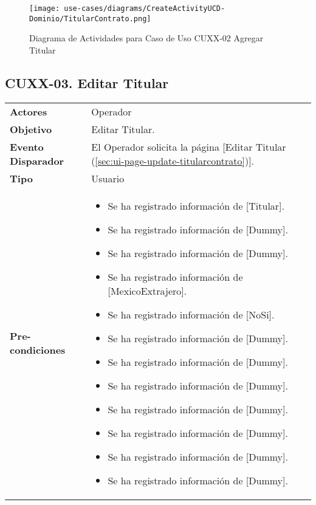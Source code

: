 	\begin{figure}[H]
		\begin{center}
			\label{tab:activity-create-ucd-entity-titularcontrato}
			\texttt{[image: use-cases/diagrams/CreateActivityUCD-Dominio/TitularContrato.png]}
			\caption{Diagrama de Actividades para Caso de Uso CUXX-02 Agregar Titular}	
	    \end{center}
	\end{figure}
			
	
	\clearpage
	\subsection{CUXX-03. Editar Titular} \label{sec:cu-update-TitularContrato}
	
	\begin{tabular}{ p{3.5cm} p{11.5cm} }
		\textbf{Actores} & Operador\\
		\textbf{Objetivo} & Editar Titular.\\
		\textbf{Evento Disparador} & El Operador solicita la p\'agina [Editar Titular (\ref{sec:ui-page-update-titularcontrato})].\\
		\textbf{Tipo} & Usuario\\
		\textbf{Pre-condiciones} &
			\begin{minipage}[t]{0.6\textwidth}
			\begin{itemize}[noitemsep,nolistsep]
			\setlength{\itemindent}{-.5cm}
				\item Se ha registrado informaci\'on de [Titular].
				\item Se ha registrado informaci\'on de [Dummy].
				\item Se ha registrado informaci\'on de [Dummy].
				\item Se ha registrado informaci\'on de [MexicoExtrajero].
				\item Se ha registrado informaci\'on de [NoSi].
				\item Se ha registrado informaci\'on de [Dummy].
				\item Se ha registrado informaci\'on de [Dummy].
				\item Se ha registrado informaci\'on de [Dummy].
				\item Se ha registrado informaci\'on de [Dummy].
				\item Se ha registrado informaci\'on de [Dummy].
				\item Se ha registrado informaci\'on de [Dummy].
				\item Se ha registrado informaci\'on de [Dummy].

\end{itemize}
\end{minipage}
\end{tabular}
